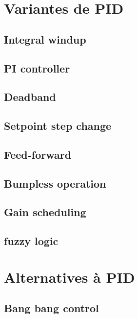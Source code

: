 \section{Variantes de PID}

\subsection{Integral windup}

\subsection{PI controller}

\subsection{Deadband}

\subsection{Setpoint step change}

\subsection{Feed-forward}

\subsection{Bumpless operation}

\subsection{Gain scheduling}

\subsection{fuzzy logic}

\section{Alternatives à PID}

\subsection{Bang bang control}

